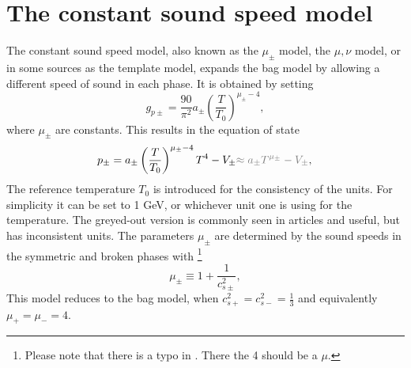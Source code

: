 \section{The constant sound speed model}
\label{const_cs}
The constant sound speed model, also known as the $\mu_\pm$ model, the $\mu, \nu$ model,
or in some sources as the template model,
expands the bag model by allowing a different speed of sound in each phase.
\cites{leitao_hydrodynamics_2015}{giese_2020}{giese_2021}
It is obtained by setting
\begin{equation}
g_{p\pm} = \frac{90}{\pi^2} a_\pm \left( \frac{T}{T_0} \right)^{\mu_\pm - 4},
\end{equation}
where $\mu_\pm$ are constants.
This results in the equation of state
\cites[eq. 15]{giese_2021}[eq. 38]{giese_2020}
\begin{equation}
p_\pm = a_\pm \left( \frac{T}{T_0} \right)^{\mu_\pm - 4} T^4 - V_\pm {\color{gray} \approx a_\pm T^{\mu_\pm} - V_\pm }, \\
\end{equation}
The reference temperature $T_0$ is introduced for the consistency of the units.
For simplicity it can be set to 1 GeV, or whichever unit one is using for the temperature.
The greyed-out version is commonly seen in articles and useful, but has inconsistent units.
The parameters $\mu_\pm$ are determined by the sound speeds in the symmetric and broken phases with
\cites[eq. 16]{giese_2021}[eq. 39]{giese_2020}
\footnote{Please note that there is a typo in \cite[eq. 15]{giese_2021}. There the 4 should be a $\mu$.}
\begin{equation}
\mu_\pm \equiv 1 + \frac{1}{c_{s\pm}^2},
\end{equation}
This model reduces to the bag model,
when $c_{s+}^2 = c_{s-}^2 = \frac{1}{3}$
and equivalently
$\mu_+ = \mu_- = 4$.

